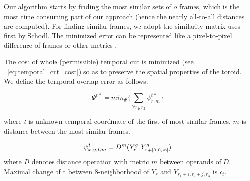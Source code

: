 	Our algorithm starts by finding the most similar sets of $o$ frames, which is the most time consuming part of our approach (hence the nearly all-to-all distances are computed). For finding similar frames, we adopt the similarity matrix uses first by Schodl\cite{Schodl00videotextures}. The minimized error can be represented like a pixel-to-pixel difference of frames or other metrics \cite{doretto05dissertation,Kwatra05textureoptimization}. 

	The cost of whole (permissible) temporal cut is minimized (see ~\ref{eq:temporal_cut_cost}) so as to preserve the spatial properties of the toroid. We define the temporal overlap error as follows: 
	
	\begin{equation} \label{eq:temporal_cut_cost}
		\Psi^{t*}  =  min_{\Psi}\{  \sum_{\forall r_1,r_2}{\psi_{r,m}^{t*}}\}
	\end{equation}
	
	where $t$ is unknown temporal coordinate of the first of most similar frames, $m$ is distance between the most similar frames.
	
	\begin{equation} \label{eq:temporal_cut_cost2}
	\psi_{x,y,t,m}^t =  D^m ( Y_r^g , Y^g_{r+[0,0,m]})\\
	\end{equation}
	where $D$ denotes distance operation with metric $m$ between operands of $D$. Maximal change of t between  8-neighborhood of $Y_{r}$ and $ Y_{r_1+i,r_2+j,r_3}$ is $c_t$.

	
	

